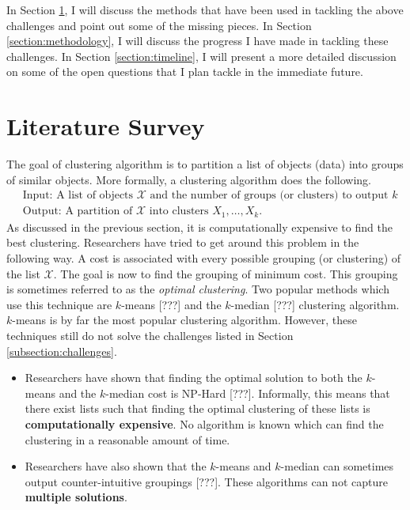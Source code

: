 \documentclass[11pt]{article}
\newcommand{\mc}{\mathcal}
\begin{document}
In Section \ref{section:literaturesurvey}, I will discuss the methods that have been used in tackling the above challenges and point out some of the missing pieces. In Section \ref{section:methodology}, I will discuss the progress I have made in tackling these challenges. In Section \ref{section:timeline}, I will present a more detailed discussion on some of the open questions that I plan tackle in the immediate future.

\section{Literature Survey}
\label{section:literaturesurvey}
The goal of clustering algorithm is to partition a list of objects (data) into groups of similar objects. More formally, a clustering algorithm does the following.
\begin{align*}
&\text{Input: A list of objects }\mc X\text{ and the number of groups (or clusters) to output }k\\
&\text{Output: A partition of }\mc X\text{ into clusters }X_1, \ldots, X_k.
\end{align*}
As discussed in the previous section, it is computationally expensive to find the best clustering. Researchers have tried to get around this problem in the following way. A cost is associated with every possible grouping (or clustering) of the list $\mc X$. The goal is now to find the grouping of minimum cost. This grouping is sometimes referred to as the \textit{optimal clustering}. Two popular methods which use this technique are $k$-means {\color{red} [???]} and the $k$-median {\color{red} [???]} clustering algorithm. $k$-means is by far the most popular clustering algorithm. However, these techniques still do not solve the challenges listed in Section \ref{subsection:challenges}. 
\begin{itemize}
\item Researchers have shown that finding the optimal solution to both the $k$-means and the $k$-median cost is NP-Hard {\color{red} [???]}.  Informally, this means that there exist lists such that finding the optimal clustering of these lists is \textbf{computationally expensive}.  No algorithm is known which can find the clustering in a reasonable amount of time. 
\item Researchers have also shown that the $k$-means and $k$-median can sometimes output counter-intuitive groupings {\color{red} [???]}. These algorithms can not capture \textbf{multiple solutions}.
\end{itemize}
\end{document}
